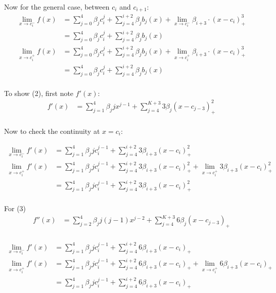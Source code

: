 \documentclass{article}
\begin{document}
    Now for the general case, between $c_i$ and $c_{i+1}$:
    \[ 
        \begin{aligned}
            \lim_{x \rightarrow c_i^-} f(x) & = \sum_{j=0}^4 \beta_j c_i^j + \sum_{j=4}^{i+2} \beta_{j} b_j(x) + \lim_{x \rightarrow c_i^-} \beta_{i+3}\cdot (x-c_{i})^3_+\\
            & = \sum_{j=0}^4 \beta_j c_i^j + \sum_{j=4}^{i+2} \beta_{j} b_j(x) \\
            \lim_{x \rightarrow c_i^+} f(x) & = \sum_{j=0}^4 \beta_j c_i^j + \sum_{j=4}^{i+2} \beta_{j} b_j(x) + \lim_{x \rightarrow c_i^+} \beta_{i+3}\cdot (x-c_{i})^3_+\\
            & = \sum_{j=0}^4 \beta_j c_i^j + \sum_{j=4}^{i+2} \beta_{j} b_j(x) \\
        \end{aligned}
    \]

    To show (2), first note $f'(x)$:
    \[ 
        \begin{aligned}
            f'(x) & = \sum_{j=1}^4 \beta_j j x^{j-1} + \sum_{j=4}^{K+3} 3\beta_{j} (x-c_{j-3})^2_+\\
        \end{aligned}
    \]

    Now to check the continuity at $x=c_i$:

    \[ 
        \begin{aligned}
            \lim_{x \rightarrow c_i^-} f'(x) & = \sum_{j=1}^4 \beta_j j c_i^{j-1} + \sum_{j=4}^{i+2} 3\beta_{i+3} (x-c_{i})^2_+\\
            \lim_{x \rightarrow c_i^+} f'(x) & = \sum_{j=1}^4 \beta_j j c_i^{j-1} + \sum_{j=4}^{i+2} 3\beta_{i+3} (x-c_{i})^2_+ + \lim_{x \rightarrow c_i^+} 3\beta_{i+3} (x-c_{i})^2_+ \\
            & = \sum_{j=1}^4 \beta_j j c_i^{j-1} + \sum_{j=4}^{i+2} 3\beta_{i+3} (x-c_{i})^2_+ \\
        \end{aligned}
    \]


    For (3)
    \[ 
        \begin{aligned}
            f''(x) & = \sum_{j=2}^4 \beta_j j (j-1)x^{j-2} + \sum_{j=4}^{K+3} 6 \beta_{j} (x-c_{j-3})_+\\
        \end{aligned}
    \]

    \[ 
        \begin{aligned}
            \lim_{x \rightarrow c_i^-} f'(x) & = \sum_{j=1}^4 \beta_j j c_i^{j-1} + \sum_{j=4}^{i+2} 6\beta_{i+3} (x-c_{i})_+\\
            \lim_{x \rightarrow c_i^+} f'(x) & = \sum_{j=1}^4 \beta_j j c_i^{j-1} + \sum_{j=4}^{i+2} 6\beta_{i+3} (x-c_{i})_+ + \lim_{x \rightarrow c_i^+} 6\beta_{i+3} (x-c_{i})_+ \\
            & = \sum_{j=1}^4 \beta_j j c_i^{j-1} + \sum_{j=4}^{i+2} 6\beta_{i+3} (x-c_{i})_+ \\
        \end{aligned}
    \]
\end{document}

